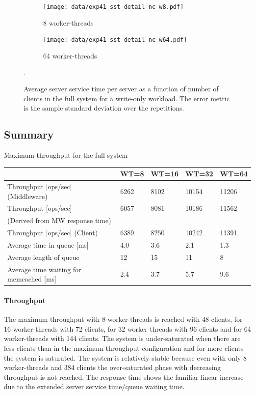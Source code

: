 \documentclass[report.tex]{subfiles}
\begin{document}
\begin{figure}[H]
	\begin{subfigure}[b]{.49\linewidth}
		\centering
		\texttt{[image: data/exp41\_sst\_detail\_nc\_w8.pdf]}
		\caption{8 worker-threads}
	\end{subfigure}\hfill
	\begin{subfigure}[b]{.49\linewidth}
		\centering
		\texttt{[image: data/exp41\_sst\_detail\_nc\_w64.pdf]}
		\caption{64 worker-threads}
	\end{subfigure}%
	\caption{Average server service time per server as a function of number of clients in the full system for a write-only workload. The error metric is the sample standard deviation over the repetitions.}\label{exp41_sst_detail_nc}.
\end{figure}

\subsection{Summary}

\begin{center}
	{Maximum throughput for the full system}
	\begin{tabular}{|l|p{1.5cm}|p{1.5cm}|p{1.5cm}|p{1.5cm}|}
		\hline                                            			& WT=8 & WT=16 & WT=32 & WT=64 \\ 
		\hline Throughput [ops/sec] (Middleware)                    & 6262 &  8102 & 10154 & 11206 \\ 
		\hline Throughput [ops/sec] & 6057 &  8081 & 10186 & 11562 \\ 
		(Derived from MW response time) &  &   &  &  \\ 
		\hline Throughput [ops/sec] (Client)              			& 6389 &  8250 & 10242 & 11391 \\ 
		\hline Average time in queue [ms]                 			&  4.0 &   3.6 &   2.1 &   1.3 \\ 
		\hline Average length of queue                    			&   12 &    15 &    11 &     8 \\ 
		\hline Average time waiting for memcached [ms]    			&  2.4 &   3.7 &   5.7 &   9.6 \\ 
		\hline 
	\end{tabular}
\end{center}


\paragraph{Throughput}
The maximum throughput with 8 worker-threads is reached with 48 clients, for 16 worker-threads with 72 clients, for 32 worker-threads with 96 clients and for 64 worker-threads with 144 clients. The system is under-saturated when there are less clients than in the maximum throughput configuration and for more clients the system is saturated. The system is relatively stable because even with only 8 worker-threads and 384 clients the over-saturated phase with decreasing throughput is not reached. The response time shows the familiar linear increase due to the extended server service time/queue waiting time.
 
\end{document}
